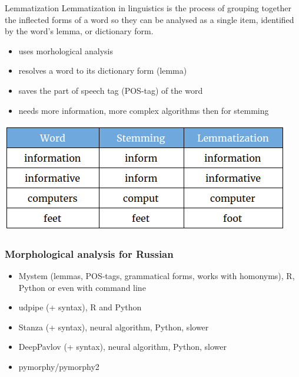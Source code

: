\documentclass{beamer}
\begin{document}
    \begin{frame}{Lemmatization}
       Lemmatization in linguistics is the process of grouping together the inflected forms of a word so they can be analysed as a single item, identified by the word's lemma, or dictionary form.
       \begin{itemize}
           \item uses morhological analysis
           \item resolves a word to its dictionary form (lemma)
           \item saves the part of speech tag (POS-tag) of the word
           \item needs more information, more complex algorithms then for stemming
       \end{itemize}

        \includegraphics[width=\textwidth]{stemmin_lemm_ex-1.png}
    \end{frame}

       \begin{frame}
  \frametitle{Morphological analysis for Russian}
  \begin{itemize}
  \item Mystem (lemmas, POS-tags, grammatical forms, works with homonyms), R, Python or even with command line
  \item udpipe (+ syntax), R and Python
  \item Stanza (+ syntax), neural algorithm, Python, slower
  \item DeepPavlov (+ syntax), neural algorithm, Python, slower
  \item pymorphy/pymorphy2
  \end{itemize}
\end{frame}
\end{document}
